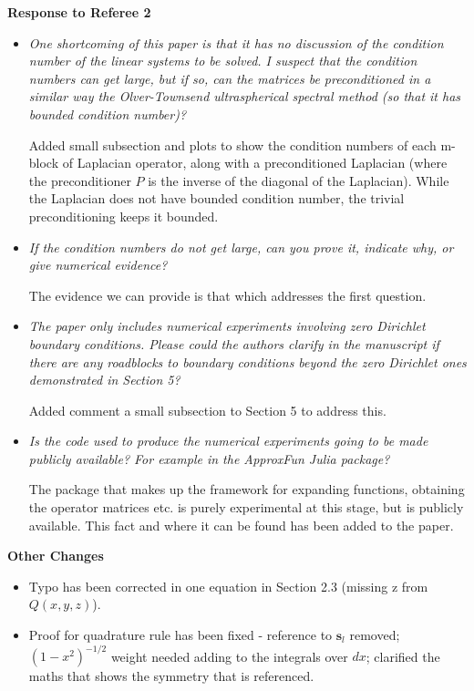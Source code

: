 \documentclass[10pt]{letter}
\newcommand{\comment}[1]{\textit{\color{bluey}#1}}
\newcommand{\bstodoinline}{\todo[color=pink,inline=true]}
\begin{document}
\bigskip 

\centerline{\textbf{Response to Referee 2}}

\begin{itemize}[parsep=1em,leftmargin=1em]

\item \comment{One shortcoming of this paper is that it has no discussion of the condition number of the linear systems to be solved. I suspect that the condition numbers can get large, but if so, can the matrices be preconditioned in a similar way the Olver-Townsend ultraspherical spectral method (so that it has bounded condition number)?}

Added small subsection and plots to show the condition numbers of each m-block of Laplacian operator, along with a preconditioned Laplacian (where the preconditioner $P$ is the inverse of the diagonal of the Laplacian). While the Laplacian does not have bounded condition number, the trivial preconditioning keeps it bounded.


\item \comment{If the condition numbers do not get large, can you prove it, indicate why, or give numerical evidence?}

The evidence we can provide is that which addresses the first question.


\item \comment{The paper only includes numerical experiments involving zero Dirichlet boundary conditions. Please could the authors clarify in the manuscript if there are any roadblocks to boundary conditions beyond the zero Dirichlet ones demonstrated in Section 5?}

Added comment a small subsection to Section 5 to address this. \bstodoinline{Is this enough?}


\item \comment{Is the code used to produce the numerical experiments going to be made publicly available? For example in the ApproxFun Julia package?}

The package that makes up the framework for expanding functions, obtaining the operator matrices etc. is purely experimental at this stage, but is publicly available. This fact and where it can be found has been added to the paper.


\end{itemize}


\bigskip

\centerline{\textbf{Other Changes}}

\begin{itemize}[parsep=1em,leftmargin=1em]
	\item Typo has been corrected in one equation in Section 2.3 (missing z from $Q(x,y,z)$).
	\item Proof for quadrature rule has been fixed - reference to $\bm{s}_l$ removed; $(1-x^2)^{-1/2}$ weight needed adding to the integrals over $dx$; clarified the maths that shows the symmetry that is referenced.
\end{itemize}
\end{document}

